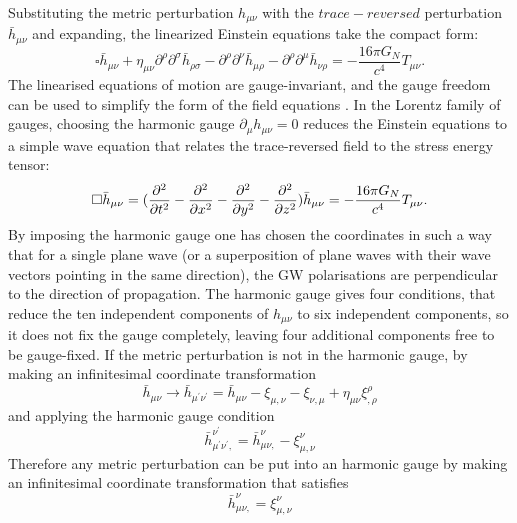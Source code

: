 \documentclass[binding=0.6cm, LaM]{sapthesis}
\begin{document}
	Substituting the metric perturbation $h_{\mu\nu}$ with the $trace-reversed$ perturbation ${\bar h}_{\mu\nu}$ and expanding, 
	the linearized Einstein equations take the compact form:
		\begin{equation}
			\square {\bar h}_{\mu\nu} + \eta_{\mu\nu}{\partial}^{\rho}{\partial}^{\sigma}{\bar h}_{\rho\sigma} - {\partial}^{\rho}{\partial}^{\nu}{\bar h}_{\mu\rho} - {\partial}^{\rho}{\partial}^{\mu}{\bar h}_{\nu\rho} = - \frac{16\pi G_{N}}{c^4}T_{\mu\nu}.
		\end{equation}
	The linearised equations of motion are gauge-invariant, and the gauge freedom can
 	be used to simplify the form of the field equations \cite{17}.
 	In the Lorentz family of gauges, choosing the harmonic gauge $ \partial_{\mu}h_{\mu\nu} = 0 $ 
	reduces the Einstein equations to a simple wave equation that relates the trace-reversed field
 	to the stress energy tensor:
		\begin{equation}
			\label{reduceinstein}
			\square {\bar h}_{\mu\nu} =({\partial^2 \over {\partial t^2} } - {\partial^2 \over {\partial x^2}}  - {\partial^2 \over {\partial y^2}}  -  {\partial^2 \over {\partial z^2}}) {\bar h}_{\mu\nu} = -{{16\pi G_{N}} \over {c^4}}T_{\mu\nu}. 
		\end{equation}
	By imposing the harmonic gauge one has chosen the coordinates in such a way that for a single plane wave 
	(or a superposition of plane waves with their wave vectors pointing in the same direction),
	the GW polarisations are perpendicular to the direction of propagation.
	The harmonic gauge gives four conditions, that reduce the ten independent components of
	$h_{\mu\nu}$ to six independent components, so it does not fix the gauge completely,
	leaving four additional components free to be gauge-fixed.
	If the metric perturbation is not in the harmonic gauge, by making an infinitesimal coordinate transformation
		\begin{equation}
			{\bar h}_{\mu\nu} \rightarrow {\bar h}_{\mu^\prime\nu^\prime}  = {\bar h}_{\mu\nu}  - \xi_{\mu,\nu} -\xi_{\nu,\mu} + \eta_{\mu\nu}\xi^{\rho}_{,\rho}
		\end{equation}
	and applying the harmonic gauge condition
		\begin{equation}
			{\bar h}_{\mu^\prime\nu^\prime,} ^{\nu^\prime} = {\bar h}_{\mu\nu,} ^{\nu} - \xi_{\mu,\nu}^{\nu}
		\end{equation}
	Therefore any metric perturbation can be put into an harmonic gauge by making an infinitesimal 
	coordinate transformation that satisfies
		\begin{equation}
			{\bar h}_{\mu\nu,} ^{\nu} = \xi_{\mu,\nu}^{\nu}
		\end{equation}
\end{document}

